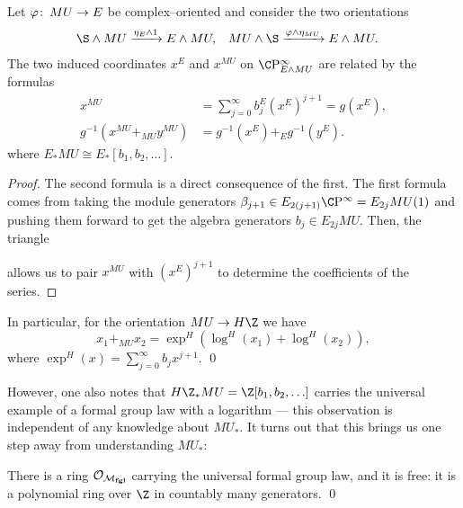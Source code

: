 \begin{lemma}\label{OrientationsOnEAndMU}
Let $\varphi\colon\thinspace MU \to E$ be complex--oriented and consider the two orientations
\begin{align*}
\S \sm MU & \xrightarrow{\eta_E \sm 1} E \sm MU, &
MU \sm \S & \xrightarrow{\phi \sm \eta_{MU}} E \sm MU.
\end{align*}
The two induced coordinates $x^E$ and $x^{MU}$ on $\CP^\infty_{E \sm MU}$ are related by the formulas
\begin{align*}
x^{MU} & = \sum_{j=0}^\infty b_j^E (x^E)^{j+1} = g(x^E), \\
g^{-1}(x^{MU} +_{MU} y^{MU}) & = g^{-1}(x^E) +_E g^{-1}(y^E).
\end{align*}
where $E_* MU \cong E_*[b_1, b_2, \ldots]$.
\end{lemma}
\begin{proof}
The second formula is a direct consequence of the first.  The first formula comes from taking the module generators $\beta_{j+1} \in E_{2(j+1)} \CP^\infty = E_{2j} MU(1)$ and pushing them forward to get the algebra generators $b_j \in E_{2j} MU$.  Then, the triangle
\begin{center}
\end{center}
allows us to pair $x^{MU}$ with $(x^E)^{j+1}$ to determine the coefficients of the series.
\end{proof}

\begin{corollary}
In particular, for the orientation $MU \to H\Z$ we have \[x_1 +_{MU} x_2 = \exp^H(\log^H(x_1) + \log^H(x_2)),\] where $\exp^H(x) = \sum_{j=0}^\infty b_j x^{j+1}$. \qed
\end{corollary}

However, one also notes that $H\Z_* MU = \Z[b_1, b_2, \ldots]$ carries the universal example of a formal group law with a logarithm --- this observation is independent of any knowledge about $MU_*$.  It turns out that this brings us one step away from understanding $MU_*$:

\begin{theorem}\label{DummyLazardsThm}
There is a ring $\mathcal{O}_{\mathcal{M}_{\mathbf{fgl}}}$ carrying the universal formal group law, and it is free: it is a polynomial ring over $\Z$ in countably many generators. \qed
\end{theorem}

